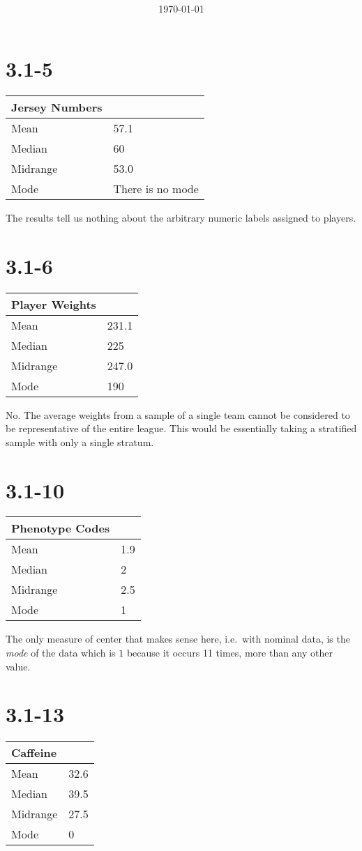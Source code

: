 \documentclass[12pt,fleqn]{article}
\title{\classdescription\ \\ \classname\ \\ $\ $ \\ \assignment}
\author{\authorname}
\date{\today}
\newcommand{\chapter}{3.1}
\newcommand{\problem}[1]{\vspace{5ex}\section*{\chapter-#1}}
\newcommand{\thead}[1]{\textnormal{\textbf{#1}}}
\begin{document}
\maketitle

\enlargethispage{\baselineskip}

\problem{5}
\begin{tabular}{@{}ll@{}}
  \thead{Jersey Numbers} \\
  \toprule
  Mean & 57.1 \\
  Median & 60 \\
  Midrange & 53.0 \\
  Mode & There is no mode \\
  \bottomrule
\end{tabular}
\vspace{1em}

The results tell us nothing about the arbitrary numeric labels assigned to players.


\problem{6}
\begin{tabular}{@{}ll@{}}
  \thead{Player Weights} \\
  \toprule
  Mean & 231.1 \\
  Median & 225 \\
  Midrange & 247.0 \\
  Mode & 190 \\
  \bottomrule
\end{tabular}
\vspace{1em}

No. The average weights from a sample of a single team cannot be considered to be representative of the entire league. This would be essentially taking a stratified sample with only a single stratum.


\problem{10}
\begin{tabular}{@{}ll@{}}
  \thead{Phenotype Codes} \\
  \toprule
  Mean & 1.9 \\
  Median & 2 \\
  Midrange & 2.5 \\
  Mode & 1 \\
  \bottomrule
\end{tabular}
\vspace{1em}

The only measure of center that makes sense here, i.e.\ with nominal data, is the \textit{mode} of the data which is $1$ because it occurs 11 times, more than any other value.


\problem{13}
\begin{tabular}{@{}ll@{}}
  \thead{Caffeine} \\
  \toprule
  Mean & 32.6 \\
  Median & 39.5 \\
  Midrange & 27.5 \\
  Mode & 0 \\
  \bottomrule
\end{tabular}
\vspace{1em}
\end{document}
